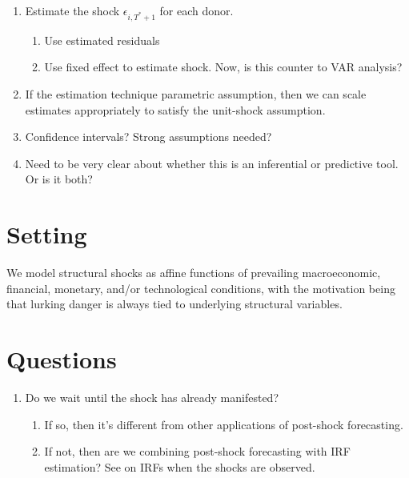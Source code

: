 \documentclass[11pt]{article}
\theoremstyle{definition}
\begin{document}
\begin{enumerate}
    \item Estimate the shock $\epsilon_{i,T^*+1}$ for each donor.
    \begin{enumerate}
      \item Use estimated residuals
      \item Use fixed effect to estimate shock.  Now, is this counter to VAR analysis?
    \end{enumerate}
    \item If the estimation technique parametric assumption, then we can scale estimates appropriately to satisfy the unit-shock assumption.
    \item Confidence intervals?  Strong assumptions needed?
    \item Need to be very clear about whether this is an inferential or predictive tool.  Or is it both?
\end{enumerate}

\section{Setting}
We model structural shocks as affine functions of prevailing macroeconomic, financial, monetary, and/or technological conditions, with the motivation being that lurking danger is always tied to underlying structural variables.

\section{Questions}

\begin{enumerate}
  \item Do we wait until the shock has already manifested?
  \begin{enumerate}
    \item If so, then it's different from other applications of post-shock forecasting.
    \item If not, then are we combining post-shock forecasting with IRF estimation?
    See \citet{choi2019estimating} on IRFs when the shocks are observed.
  \end{enumerate}
\end{enumerate}
\end{document}
